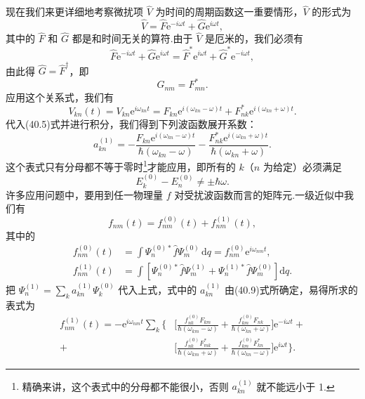 现在我们来更详细地考察微扰项 $\hat{V}$ 为时间的周期函数这一重要情形，$\hat{V}$ 的形式为
\begin{equation}
  \hat{V}=\hat{F}\mathrm{e}^{-i\omega t}+\hat{G}\mathrm{e}^{i\omega t},
\end{equation}
其中的 $\hat{F}$ 和 $\hat{G}$ 都是和时间无关的算符.由于 $\hat{V}$ 是厄米的，我们必须有
\begin{equation*}
  \hat{F}\mathrm{e}^{-i\omega t}+\hat{G}\mathrm{e}^{i\omega t}
  =\hat{F}^{*}\mathrm{e}^{i\omega t}+\hat{G}^{*}\mathrm{e}^{-i\omega t},
\end{equation*}
由此得 $\hat{G}=\hat{F}^{\dagger}$，即
\begin{equation}
  G_{nm}=F_{mn}^{*}.
\end{equation}
应用这个关系式，我们有
\begin{equation}
  V_{kn}(t)=V_{kn}\mathrm{e}^{i\omega_{kn}t}
  =F_{kn}\mathrm{e}^{i(\omega_{kn}-\omega)t}
  +F_{nk}^{*}\mathrm{e}^{i(\omega_{kn}+\omega)t}.
\end{equation}
代入(40.5)式并进行积分，我们得到下列波函数展开系数：
\begin{equation}
  a_{kn}^{(1)}=-\frac{F_{kn}\mathrm{e}^{i(\omega_{kn}-\omega)t}}{\hbar(\omega_{kn}-\omega)}
  -\frac{F_{nk}^{*}\mathrm{e}^{i(\omega_{kn}+\omega)t}}{\hbar(\omega_{kn}+\omega)}.
\end{equation}
这个表式只有分母都不等于零时\footnote{精确来讲，这个表式中的分母都不能很小，否则 $a_{kn}^{(1)}$ 就不能远小于 1.}才能应用，即所有的 $k$（$n$ 为给定）必须满足
\begin{equation}
  E_k^{(0)}-E_n^{(0)}\neq\pm\hbar\omega.
\end{equation}
许多应用问题中，要用到任一物理量 $f$ 对受扰波函数而言的矩阵元.一级近似中我们有
\begin{equation*}
  f_{nm}(t)=f_{nm}^{(0)}(t)+f_{nm}^{(1)}(t),
\end{equation*}
其中的
\begin{equation*}
\begin{aligned}
  f_{nm}^{(0)}(t)&=\int\varPsi_n^{(0)*}\hat{f}\varPsi_m^{(0)}\,\mathrm{d}q
  =f_{nm}^{(0)}\mathrm{e}^{i\omega_{nm}t},\\
  f_{nm}^{(1)}(t)&=\int\left[\varPsi_n^{(0)*}\hat{f}\varPsi_m^{(1)}
  +\varPsi_n^{(1)*}\hat{f}\varPsi_m^{(0)}\right]\mathrm{d}q.
\end{aligned}
\end{equation*}
把 $\varPsi_n^{(1)}=\sum_k a_{kn}^{(1)}\varPsi_k^{(0)}$ 代入上式，式中的 $a_{kn}^{(1)}$ 由(40.9)式所确定，易得所求的表式为
\begin{equation}
\begin{aligned}
  f_{nm}^{(1)}(t)=-\mathrm{e}^{i\omega_{nm}t}\sum_k\biggl\{
  &\biggl[\frac{f_{nk}^{(0)}F_{km}}{\hbar(\omega_{km}-\omega)}
  +\frac{f_{km}^{(0)}F_{nk}}{\hbar(\omega_{kn}+\omega)}\biggr]\mathrm{e}^{-i\omega t}+\\
  +&\biggl[\frac{f_{nk}^{(0)}F_{mk}^{*}}{\hbar(\omega_{km}+\omega)}
  +\frac{f_{km}^{(0)}F_{kn}^{*}}{\hbar(\omega_{kn}-\omega)}\biggr]\mathrm{e}^{i\omega t}\biggr\}.
\end{aligned}
\end{equation}
